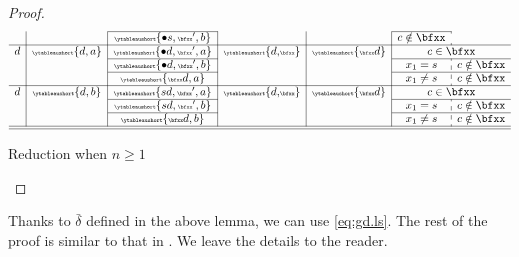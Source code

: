 \documentclass[12pt,a4paper]{amsart}
\numberwithin{equation}{section}
\newtheorem{prop}[thm]{Proposition}
\theoremstyle{remark}
\let\ytb=\ytableaushort
\newcommand{\tytb}[1]{{\tiny\ytb{#1}}}
\def\bdelta{{\bar{\delta}}}
\begin{document}
\begin{proof}
\begin{table}[p]
\[\begin{array}{c|c|c|c|c|c:c}
          \cline{3-3}\cline{6-6}
                     &            &\tytb{\bullet s,{\bfxx'},b} &                    &
                        & c\notin \bfxx   &\\%
          \hline
          d & \tytb{d,a} &\tytb{\bullet d,{\bfxx'},a} & \tytb{d{,}{\bfxx}} & \tytb{{\bfxx}d}& \multicolumn{2}{c}{c\in \bfxx}\\
          \cline{3-3}\cline{6-7}
                     &            &\tytb{\bullet d,{\bfxx'},b} &                    &
                        & x_{1}=s & c\notin \bfxx   \\%
          \cline{3-3}\cline{6-7}
                     &            &\tytb{{\bfxx}d,a} &                    &
                        & x_{1}\neq s & c\notin \bfxx   \\%
          \hline
          d & \tytb{d,b} &\tytb{s d,{\bfxx'},a} & \tytb{d{,}{\bfxx}} & \tytb{{\bfxx}d}
                        & \multicolumn{2}{c}{c\in \bfxx}\\
          \cline{3-3}\cline{6-7}
                     &            &\tytb{s d,{\bfxx'},b} &                    &
                        & x_{1}=s & c\notin \bfxx   \\%
          \cline{3-3}\cline{6-7}
                     &            &\tytb{{\bfxx}d,b} &                    &
                        & x_{1}\neq s & c\notin \bfxx   \\%
          \hline
          \hline
        \end{array}
      \]
      \caption{Reduction when $n\geq 1$}
      \label{tb:rd2}
    \end{table}
  \end{proof}

  Thanks to $\bdelta$ defined in  the above lemma, we can use \eqref{eq:gd.ls}.
  The rest of the proof is similar to that in .
  We leave the details to the reader.

\end{document}
